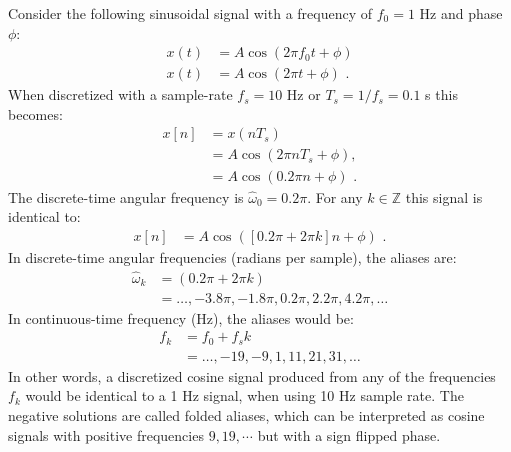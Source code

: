 Consider the following sinusoidal signal with a frequency of $f_0 =1$ Hz and phase $\phi$:
\begin{align}
x(t)&=A\cos(2\pi f_0 t + \phi)\\
x(t)&=A\cos(2\pi t + \phi)\,\,.
\end{align}
When discretized with a sample-rate $f_s=10$ Hz or $T_s=1/f_s = 0.1$ s this becomes:
\begin{align}
x[n]&=x(nT_s)\\
    &=A\cos(2\pi n T_s + \phi),\\
    &=A\cos(0.2\pi n + \phi)\,\,.
\end{align}
The discrete-time angular frequency is $\hat{\omega}_0 = 0.2\pi$. For any $k\in\mathbb{Z}$ this signal is identical to:
\begin{align}
x[n] &=A\cos([0.2\pi + 2\pi k] n + \phi)\,\,.
\end{align}
In discrete-time angular frequencies (radians per sample), the aliases are:
\begin{align}
  \hat{\omega}_k  &= (0.2\pi+2\pi k)\\
  &=\ldots,-3.8\pi,-1.8\pi,0.2\pi,2.2\pi,4.2\pi,\ldots
\end{align}
In continuous-time frequency (Hz), the aliases would be:
\begin{align}
f_k &=f_0 + f_s k\\
&=\ldots,-19,-9,1,11,21,31,\ldots
\end{align}
In other words, a discretized cosine signal produced from any of the frequencies $f_k$ would be identical to a 1 Hz signal, when using 10 Hz sample rate. 
The negative solutions are called folded aliases, which can be interpreted as cosine signals with positive frequencies $9,19,\cdots$ but with a sign flipped phase.

